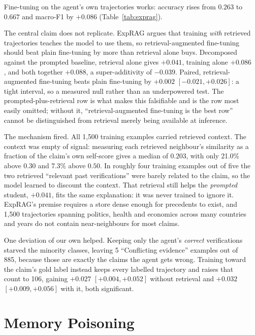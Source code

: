 \documentclass[journal]{IEEEtran}
\begin{document}
Fine-tuning on the agent's own trajectories works: accuracy rises from $0.263$
to $0.667$ and macro-F1 by $+0.086$ (Table~\ref{tab:exprag}).

The central claim does not replicate. ExpRAG argues that training \emph{with}
retrieved trajectories teaches the model to use them, so retrieval-augmented
fine-tuning should beat plain fine-tuning by more than retrieval alone buys.
Decomposed against the prompted baseline, retrieval alone gives $+0.041$,
training alone $+0.086$, and both together $+0.088$, a super-additivity of
$-0.039$. Paired, retrieval-augmented fine-tuning beats plain fine-tuning by
$+0.002$ $[-0.021, +0.026]$: a tight interval, so a measured null rather than an
underpowered test. The prompted-plus-retrieval row is what makes this
falsifiable and is the row most easily omitted; without it, ``retrieval-augmented
fine-tuning is the best row'' cannot be distinguished from retrieval merely
being available at inference.

The mechanism fired. All 1{,}500 training examples carried retrieved context.
The context was empty of signal: measuring each retrieved neighbour's similarity
as a fraction of the claim's own self-score gives a median of $0.203$, with only
21.0\% above $0.30$ and 7.3\% above $0.50$. In roughly four training examples out
of five the two retrieved ``relevant past verifications'' were barely related to
the claim, so the model learned to discount the context. That retrieval still
helps the \emph{prompted} student, $+0.041$, fits the same explanation: it was
never trained to ignore it. ExpRAG's premise requires a store dense enough for
precedents to exist, and 1{,}500 trajectories spanning politics, health and
economics across many countries and years do not contain near-neighbours for
most claims.

One deviation of our own helped. Keeping only the agent's \emph{correct}
verifications starved the minority classes, leaving 5 ``Conflicting evidence''
examples out of 885, because those are exactly the claims the agent gets wrong.
Training toward the claim's gold label instead keeps every labelled trajectory
and raises that count to 106, gaining $+0.027$ $[+0.004, +0.052]$ without
retrieval and $+0.032$ $[+0.009, +0.056]$ with it, both significant.

\section{Memory Poisoning}
\label{sec:c1}
\end{document}
